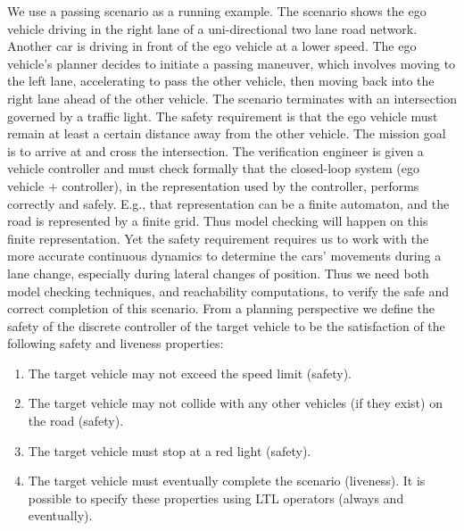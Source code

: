 {\begin{exmp}
	We use a passing scenario as a running example.
	The scenario shows the ego vehicle driving in the right lane of a uni-directional two lane road network. 
	Another car is driving in front of the ego vehicle at a lower speed.
	The ego vehicle's planner decides to initiate a passing maneuver, which involves moving to the left lane, accelerating to pass the other vehicle, then moving back into the right lane ahead of the other vehicle.
	The scenario terminates with an intersection governed by a traffic light. 
	The safety requirement is that the ego vehicle must remain at least a certain distance away from the other vehicle.
	The mission goal is to arrive at and cross the intersection.
	The verification engineer is given a vehicle controller and must check formally that the closed-loop system (ego vehicle + controller), in the representation used by the controller, performs correctly and safely.
	E.g., that representation can be a finite automaton, and the road is represented by a finite grid.
	Thus model checking will happen on this finite representation.
	Yet the safety requirement requires us to work with the more accurate continuous dynamics to determine the cars' movements during a lane change, especially during lateral changes of position. 
	Thus we need both model checking techniques, and reachability computations, to verify the safe and correct completion of this scenario.
	From a planning perspective we define the safety of the discrete controller of the target vehicle to be the satisfaction of the following safety and liveness properties:
	\begin{enumerate}
		\item The target vehicle may not exceed the speed limit (safety).
		\item The target vehicle may not collide with any other vehicles (if they exist) on the road (safety).
		\item The target vehicle must stop at a red light (safety).
		\item The target vehicle must eventually complete the scenario (liveness).
		It is possible to specify these properties using LTL operators (always and eventually).
	\end{enumerate}
\end{exmp}



%
%
%
%
%

}
